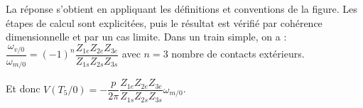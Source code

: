 \begin{corrigebox}
La réponse s'obtient en appliquant les définitions et conventions de la
    figure. Les étapes de calcul sont explicitées, puis le résultat est vérifié par
    cohérence dimensionnelle et par un cas limite.
Dans un train simple, on a : $\dfrac{\omega_{v/0}}{\omega_{m/0}} = (-1)^n \dfrac{Z_{1e}Z_{2e}Z_{3e}}{Z_{1s}Z_{2s}Z_{3s}}$ avec $n=3$ nombre de contacts extérieurs.

Et donc $V(T_5/0) =-\dfrac{p}{2\pi} \dfrac{Z_{1e}Z_{2e}Z_{3e}}{Z_{1s}Z_{2s}Z_{3s}} \omega_{m/0}$.
\end{corrigebox}
